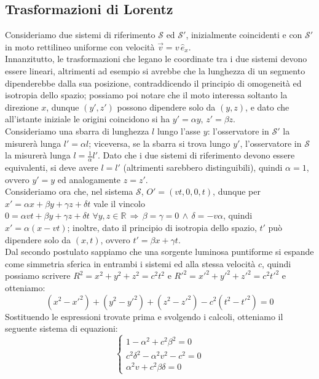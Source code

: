 \subsection{Trasformazioni di Lorentz}

Consideriamo due sistemi di riferimento $ \mathcal{S} $ ed $ \mathcal{S}' $, inizialmente coincidenti e con $ \mathcal{S}' $ in moto rettilineo uniforme con velocità $	\vec{v} = v\,\hat{e}_x $. \\ 
%
Innanzitutto, le trasformazioni che legano le coordinate tra i due sistemi devono essere lineari, altrimenti ad esempio si avrebbe che la lunghezza di un segmento dipenderebbe dalla sua posizione, contraddicendo il principio di omogeneità ed isotropia dello spazio; possiamo poi notare che il moto interessa soltanto la direzione $ x $, dunque $ (y',z') $ possono dipendere solo da $ (y,z) $, e dato che all'istante iniziale le origini coincidono si ha $ y' = \alpha y $, $ z' = \beta z $. \\ 
%
Consideriamo una sbarra di lunghezza $ l $ lungo l'asse $ y $: l'osservatore in $ \mathcal{S}' $ la misurerà lunga $ l' = \alpha l $; viceversa, se la sbarra si trova lungo $ y' $, l'osservatore in $ \mathcal{S} $ la misurerà lunga $ l = \frac{1}{\alpha} l' $. Dato che i due sistemi di riferimento devono essere equivalenti, si deve avere $ l = l' $ (altrimenti sarebbero distinguibili), quindi $ \alpha = 1 $, ovvero $ y' = y $ ed analogamente $ z = z' $. \\ 
%
Consideriamo ora che, nel sistema $ \mathcal{S} $, $ O' = (vt, 0, 0, t) $, dunque per $ x' = \alpha x + \beta y + \gamma z + \delta t $ vale il vincolo $ 0 = \alpha vt + \beta y + \gamma z + \delta t  \,\,\forall y,z\in\mathbb{R} \,\Rightarrow\, \beta = \gamma = 0 \,\wedge\, \delta = -v\alpha $, quindi $ x' = \alpha (x - vt) $; inoltre, dato il principio di isotropia dello spazio, $ t' $ può dipendere solo da $ (x,t) $, ovvero $ t' = \beta x + \gamma t $. \\ 
%
Dal secondo postulato sappiamo che una sorgente luminosa puntiforme si espande come simmetria sferica in entrambi i sistemi ed alla stessa velocità $ c $, quindi possiamo scrivere $ R^2 = x^2 + y^2 + z^2 = c^2 t^2 $ e $ R'^2 = x'^2 + y'^2 + z'^2 = c^2 t'^2 $ e otteniamo:
\begin{equation}
	(x^2- x'^2) + (y^2 - y'^2) + (z^2 - z'^2) - c^2 (t^2 - t'^2) = 0
	\label{eq:4}
\end{equation}
Sostituendo le espressioni trovate prima e svolgendo i calcoli, otteniamo il seguente sistema di equazioni:
\begin{equation}
	\begin{cases}
		1 - \alpha^2 + c^2 \beta^2 = 0 \\ 
		c^2 \delta^2 - \alpha^2 v^2 - c^2 = 0 \\ 
		\alpha^2 v + c^2 \beta\delta = 0
	\end{cases}
	\label{eq:5}
\end{equation}
